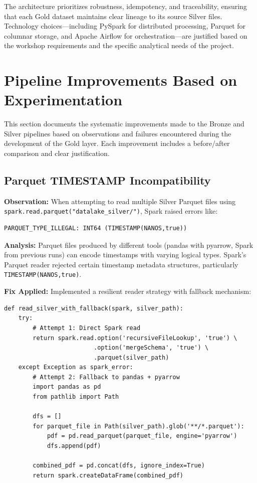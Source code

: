 \documentclass[12pt]{article}
\begin{document}
The architecture prioritizes robustness, idempotency, and traceability, ensuring that each Gold dataset maintains clear lineage to its source Silver files. Technology choices—including PySpark for distributed processing, Parquet for columnar storage, and Apache Airflow for orchestration—are justified based on the workshop requirements and the specific analytical needs of the project.

\newpage

\section{Pipeline Improvements Based on Experimentation}
\label{sec:pipeline_improvements}

This section documents the systematic improvements made to the Bronze and Silver pipelines based on observations and failures encountered during the development of the Gold layer. Each improvement includes a before/after comparison and clear justification.

\subsection{Parquet TIMESTAMP Incompatibility}

\textbf{Observation:} When attempting to read multiple Silver Parquet files using \texttt{spark.read.parquet("datalake\_silver/")}, Spark raised errors like:
\begin{verbatim}
PARQUET_TYPE_ILLEGAL: INT64 (TIMESTAMP(NANOS,true))
\end{verbatim}

\textbf{Analysis:} Parquet files produced by different tools (pandas with pyarrow, Spark from previous runs) can encode timestamps with varying logical types. Spark's Parquet reader rejected certain timestamp metadata structures, particularly \texttt{TIMESTAMP(NANOS,true)}.

\textbf{Fix Applied:} Implemented a resilient reader strategy with fallback mechanism:

\begin{lstlisting}[caption=Resilient Silver Reader Implementation]
def read_silver_with_fallback(spark, silver_path):
    try:
        # Attempt 1: Direct Spark read
        return spark.read.option('recursiveFileLookup', 'true') \
                         .option('mergeSchema', 'true') \
                         .parquet(silver_path)
    except Exception as spark_error:
        # Attempt 2: Fallback to pandas + pyarrow
        import pandas as pd
        from pathlib import Path
        
        dfs = []
        for parquet_file in Path(silver_path).glob('**/*.parquet'):
            pdf = pd.read_parquet(parquet_file, engine='pyarrow')
            dfs.append(pdf)
        
        combined_pdf = pd.concat(dfs, ignore_index=True)
        return spark.createDataFrame(combined_pdf)
\end{lstlisting}
\end{document}
